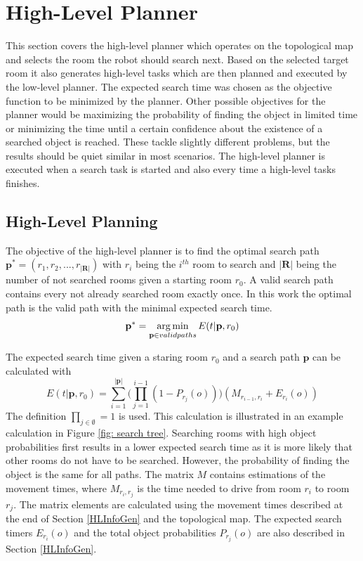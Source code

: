\section{High-Level Planner}

This section covers the high-level planner which operates on the topological map and selects the room the robot should search next. Based on the selected target room it also generates high-level tasks which are then planned and executed by the low-level planner. The expected search time was chosen as the objective function to be minimized by the planner. Other possible objectives for the planner would be maximizing the probability of finding the object in limited time or minimizing the time until a certain confidence about the existence of a searched object is reached. These tackle slightly different problems, but the results should be quiet similar in most scenarios. The high-level planner is executed when a search task is started and also every time a high-level tasks finishes. 


\subsection{High-Level Planning} \label{hl_plan}

The objective of the high-level planner is to find the optimal search path $\mathbf{p^*}=(r_1,r_2,...,r_{\mathbf{|R|}})$ with $r_i$ being the $i^{th}$ room to search and $\mathbf{|R|}$ being the number of not searched rooms given a starting room $r_0$. A valid search path contains every not already searched room exactly once. In this work the optimal path is the valid path with the minimal expected search time.
\begin{equation}
 \mathbf{p^*}=\operatorname*{arg\,min}_{\mathbf{p} \in valid paths} E(t|\mathbf{p},r_0) 
\end{equation}

The expected search time given a staring room $r_0$ and a search path $\mathbf{p}$ can be calculated with
\begin{equation} \label{expected formula}
 E(t|\mathbf{p},r_0) = \sum_{i=1}^{\mathbf{|p|}}\Big( \prod_{j=1}^{i-1}(1-P_{r_j}(o))\Big)(M_{r_{i-1},r_i}+E_{r_i}(o))
\end{equation}
The definition $\prod_{j \in \emptyset} = 1$ is used. This calculation is illustrated in an example calculation in Figure \ref{fig: search tree}. Searching rooms with high object probabilities first results in a lower expected search time as it is more likely that other rooms do not have to be searched. However, the probability of finding the object is the same for all paths. The matrix $M$ contains estimations of the movement times, where $M_{r_i,r_j}$ is the time needed to drive from room $r_i$ to room $r_j$. The matrix elements are calculated using the movement times described at the end of Section \ref{HLInfoGen} and the topological map. The expected search timers $E_{r_i}(o)$ and the total object probabilities $P_{r_j}(o)$ are also described in Section \ref{HLInfoGen}.

